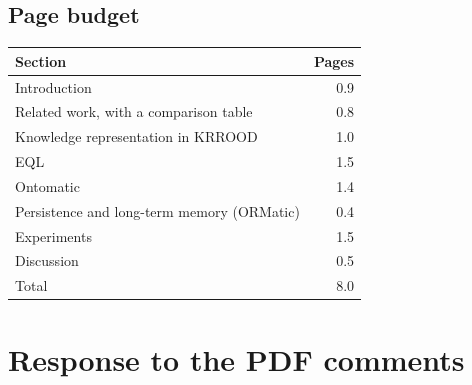 \documentclass[11pt]{article}
\begin{document}
\subsection{Page budget}
\begin{center}
\begin{tabular}{lr}
\toprule
Section & Pages\\
\midrule
Introduction & 0.9\\
Related work, with a comparison table & 0.8\\
Knowledge representation in KRROOD & 1.0\\
EQL & 1.5\\
Ontomatic & 1.4\\
Persistence and long-term memory (ORMatic) & 0.4\\
Experiments & 1.5\\
Discussion & 0.5\\
\midrule
Total & 8.0\\
\bottomrule
\end{tabular}
\end{center}

\section{Response to the PDF comments}
\end{document}
